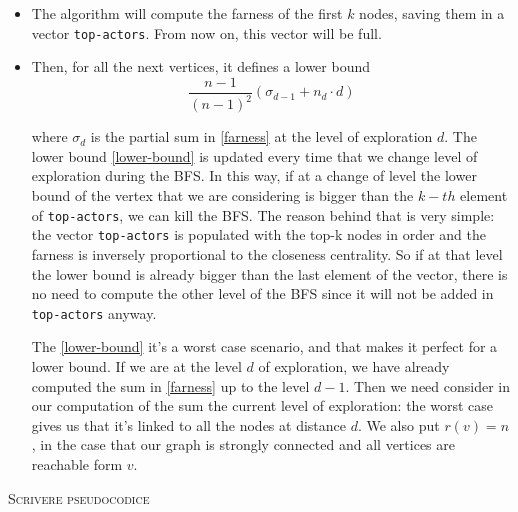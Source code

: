 \begin{itemize}
    \item The algorithm will compute the farness of the first $k$ nodes, saving them in a vector \texttt{top-actors}. From now on, this vector will be full.

    \item Then, for all the next vertices, it defines a lower bound
    \begin{equation}\label{lower-bound}
        \frac{n-1}{(n-1)^2} (\sigma_{d-1} + n_d \cdot d)
    \end{equation}

    where $\sigma_d$ is the partial sum in \eqref{farness} at the level of exploration $d$. The lower bound \eqref{lower-bound} is updated every time that we change level of exploration during the BFS. In this way, if at a change of level the lower bound of the vertex that we are considering is bigger than the $k-th$ element of \texttt{top-actors}, we can kill the BFS. The reason behind that is very simple: the vector \texttt{top-actors} is populated with the top-k nodes in order and the farness is inversely proportional to the closeness centrality. So if at that level the lower bound is already bigger than the last element of the vector, there is no need to compute the other level of the BFS since it will not be added in \texttt{top-actors} anyway. \s

    The \eqref{lower-bound} it's a worst case scenario, and that makes it perfect for a lower bound. If we are at the level $d$ of exploration, we have already computed the sum in \eqref{farness} up to the level $d-1$. Then we need consider in our computation of the sum the current level of exploration: the worst case gives us that it's linked to all the nodes at distance $d$. We also put $r(v)=n$, in the case that our graph is strongly connected and all vertices are reachable form $v$.
\end{itemize}

\textsc{Scrivere pseudocodice}




